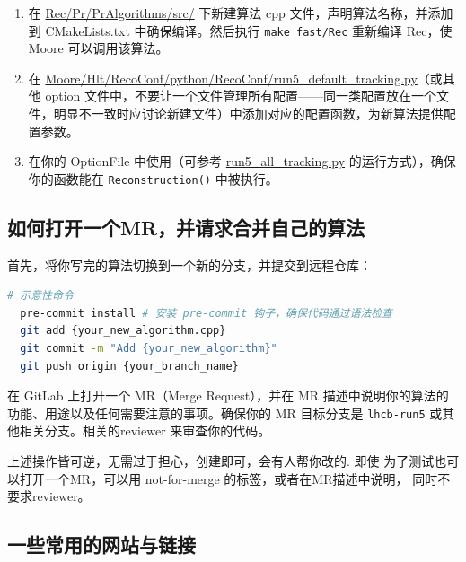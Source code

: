 \documentclass[UTF8]{article}
\begin{document}
\begin{enumerate}
	\item 在 \url{Rec/Pr/PrAlgorithms/src/} 下新建算法 cpp 文件，声明算法名称，并添加到 CMakeLists.txt 中确保编译。然后执行 \lstinline{make fast/Rec} 重新编译 Rec，使 Moore 可以调用该算法。
	\item 在 \url{Moore/Hlt/RecoConf/python/RecoConf/run5_default_tracking.py}（或其他 option 文件中，不要让一个文件管理所有配置——同一类配置放在一个文件，明显不一致时应讨论新建文件）中添加对应的配置函数，为新算法提供配置参数。
	\item 在你的 OptionFile 中使用（可参考 \url{run5_all_tracking.py} 的运行方式），确保你的函数能在 \lstinline{Reconstruction()} 中被执行。
\end{enumerate}


\subsection{如何打开一个MR，并请求合并自己的算法}


首先，将你写完的算法切换到一个新的分支，并提交到远程仓库：
\begin{lstlisting}[language=bash, label=lst:git-mr-steps, caption={创建 MR 并推送代码的步骤}]
# 示意性命令
  pre-commit install # 安装 pre-commit 钩子，确保代码通过语法检查
  git add {your_new_algorithm.cpp}
  git commit -m "Add {your_new_algorithm}"
  git push origin {your_branch_name}
\end{lstlisting}


在 GitLab 上打开一个 MR（Merge Request），并在 MR 描述中说明你的算法的功能、用途以及任何需要注意的事项。确保你的 MR 目标分支是 \lstinline{lhcb-run5} 或其他相关分支。\@ 相关的reviewer 来审查你的代码。

上述操作皆可逆，无需过于担心，创建即可，会有人帮你改的. 即使 为了测试也可以打开一个MR，可以用 not-for-merge 的标签，或者在MR描述中说明， 同时不要求reviewer。










\subsection{一些常用的网站与链接}
\end{document}
